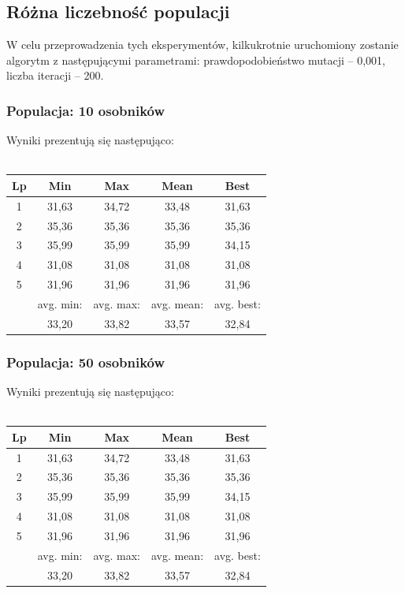 \documentclass[a4paper,11pt]{article}
\begin{document}
		\subsection{Różna liczebność populacji}
			W celu przeprowadzenia tych eksperymentów, kilkukrotnie uruchomiony zostanie algorytm z następującymi parametrami: prawdopodobieństwo mutacji -- 0,001, liczba iteracji -- 200.
			\subsubsection{Populacja: 10 osobników}
				Wyniki prezentują się następująco:\\~\\
				\begin{tabular}{|c|c|c|c|c|}
					\hline 
					Lp & Min & Max & Mean & Best \\
					\hline
					1 & 31,63  & 34,72 & 33,48 & 31,63\\\hline
					2 & 35,36 & 35,36  &35,36 & 35,36 \\\hline
					3 & 35,99 & 35,99  & 35,99 &34,15 \\\hline
					4 & 31,08 & 31,08  & 31,08& 31,08 \\\hline
					5 & 31,96 & 31,96  & 31,96 & 31,96\\\hline
					&avg. min:&avg. max:&avg. mean:&avg. best:\\\hline
					& 33,20 & 33,82& 33,57 &32,84\\\hline
				\end{tabular} 
				

			\subsubsection{Populacja: 50 osobników}
				Wyniki prezentują się następująco:\\~\\
				\begin{tabular}{|c|c|c|c|c|}
					\hline 
					Lp & Min & Max & Mean & Best \\
					\hline
					1 & 31,63  & 34,72 & 33,48 & 31,63\\\hline
					2 & 35,36 & 35,36  &35,36 & 35,36 \\\hline
					3 & 35,99 & 35,99  & 35,99 &34,15 \\\hline
					4 & 31,08 & 31,08  & 31,08& 31,08 \\\hline
					5 & 31,96 & 31,96  & 31,96 & 31,96\\\hline
					&avg. min:&avg. max:&avg. mean:&avg. best:\\\hline
					& 33,20 & 33,82& 33,57 &32,84\\\hline
				\end{tabular} 
\end{document}
